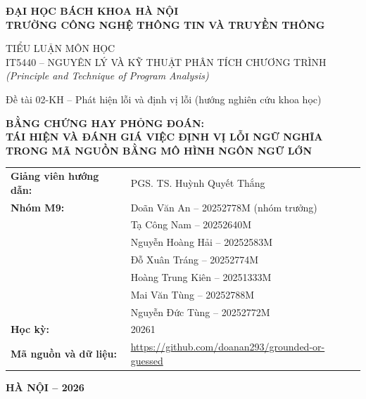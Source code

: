 \begin{titlepage}
%
\centering
{\bfseries ĐẠI HỌC BÁCH KHOA HÀ NỘI\\[2pt] TRƯỜNG CÔNG NGHỆ THÔNG TIN VÀ TRUYỀN THÔNG\par}
\vspace{1.4cm}
{\fontsize{14}{18}\selectfont TIỂU LUẬN MÔN HỌC\\[4pt]
IT5440 -- NGUYÊN LÝ VÀ KỸ THUẬT PHÂN TÍCH CHƯƠNG TRÌNH\\[2pt]
\itshape (Principle and Technique of Program Analysis)\par}
\vspace{1cm}
{Đề tài 02-KH -- Phát hiện lỗi và định vị lỗi (hướng nghiên cứu khoa học)\par}
\vspace{1cm}
{\fontsize{16}{24}\selectfont\bfseries BẰNG CHỨNG HAY PHỎNG ĐOÁN:\\
TÁI HIỆN VÀ ĐÁNH GIÁ VIỆC ĐỊNH VỊ LỖI NGỮ NGHĨA\\ TRONG MÃ NGUỒN BẰNG MÔ HÌNH NGÔN NGỮ LỚN\par}
\vspace{0.5cm}

\vspace{1.2cm}
\begin{tabular}{@{}l l@{}}
\textbf{Giảng viên hướng dẫn:} & PGS. TS. Huỳnh Quyết Thắng \\[8pt]
\textbf{Nhóm M9:} & Doãn Văn An -- 20252778M (nhóm trưởng) \\
 & Tạ Công Nam -- 20252640M \\
 & Nguyễn Hoàng Hải -- 20252583M \\
 & Đỗ Xuân Tráng -- 20252774M \\
 & Hoàng Trung Kiên -- 20251333M \\
 & Mai Văn Tùng -- 20252788M \\
 & Nguyễn Đức Tùng -- 20252772M \\[8pt]
\textbf{Học kỳ:} & 20261 \\[4pt]
\textbf{Mã nguồn và dữ liệu:} & \small\url{https://github.com/doanan293/grounded-or-guessed} \\
\end{tabular}
\vfill
{\bfseries HÀ NỘI -- 2026\par}
\end{titlepage}

